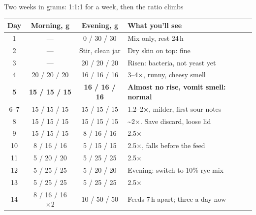 \documentclass[aspectratio=169,11pt]{beamer}
\begin{document}
\begin{frame}{Two weeks in grams: 1:1:1 for a week, then the ratio climbs}
  \footnotesize
  \renewcommand{\arraystretch}{0.95}
  \begin{tabularx}{\linewidth}{@{}c c c X@{}}
    \toprule
    \textbf{Day} & \textbf{Morning, g} & \textbf{Evening, g} & \textbf{What you'll see} \\
    \midrule
    1   & --- & 0 / 30 / 30 & Mix only, rest 24\,h \\
    2   & --- & Stir, clean jar & Dry skin on top: fine \\
    3   & --- & 20 / 20 / 20 & Risen: bacteria, not yeast yet \\
    4   & 20 / 20 / 20 & 16 / 16 / 16 & 3--4×, runny, cheesy smell \\
    \textbf{5} & \textbf{15 / 15 / 15} & \textbf{16 / 16 / 16} & \textbf{Almost no rise, vomit smell: normal} \\
    6--7 & 15 / 15 / 15 & 15 / 15 / 15 & 1.2--2×, milder, first sour notes \\
    8   & 15 / 15 / 15 & 15 / 15 / 15 & \textasciitilde 2×. Save discard, loose lid \\
    9   & 15 / 15 / 15 & 8 / 16 / 16 & 2.5× \\
    10  & 8 / 16 / 16 & 5 / 15 / 15 & 2.5×, falls before the feed \\
    11  & 5 / 20 / 20 & 5 / 25 / 25 & 2.5× \\
    12  & 5 / 25 / 25 & 5 / 20 / 20 & Evening: switch to 10\% rye mix \\
    13  & 5 / 25 / 25 & 5 / 25 / 25 & 2.5× \\
    14  & 8 / 16 / 16 ×2 & 10 / 50 / 50 & Feeds 7\,h apart; three a day now \\
    \bottomrule
  \end{tabularx}
\end{frame}
\end{document}

